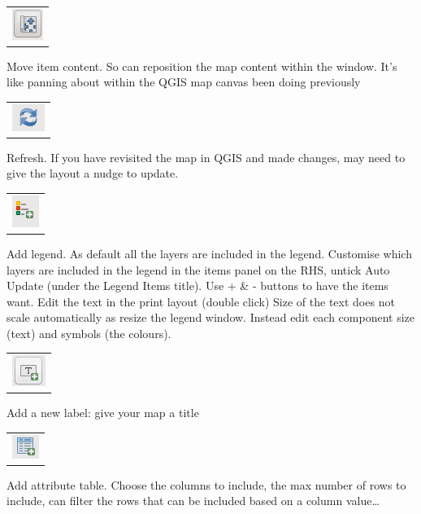 \begin{tabular}{@{}c@{}}\includegraphics[width=4ex]{images/move_item_content_icon.png}\end{tabular}
Move item content.  So can reposition the map content within the window.  It’s like panning about within the QGIS map canvas been doing previously


\begin{tabular}{@{}c@{}}\includegraphics[width=4ex]{images/refresh_icon.png}\end{tabular}
Refresh.  If you have revisited the map in QGIS and made changes, may need to give the layout a nudge to update.

\begin{tabular}{@{}c@{}}\includegraphics[width=4ex]{images/add_legend_icon.png}\end{tabular}
Add legend.  As default all the layers are included in the legend. Customise which layers are included in the legend in the items panel on the RHS, untick Auto Update (under the Legend Items title).  
Use + \& - buttons to have the items want.  Edit the text in the print layout (double click)
Size of the text does not scale automatically as resize the legend window. Instead edit each component size (text) and symbols (the colours).

\begin{tabular}{@{}c@{}}\includegraphics[width=4ex]{images/add_new_label_icon.png}\end{tabular}
Add a new label: give your map a title


\begin{tabular}{@{}c@{}}\includegraphics[width=4ex]{images/add_attribute_table_icon.png}\end{tabular}
Add attribute table.  Choose the columns to include, the max number of rows to include, can filter the rows that can be included based on a column value…

